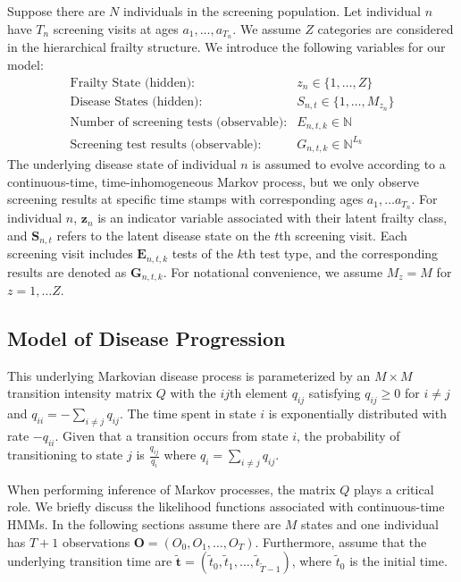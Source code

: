 \documentclass{article}
\begin{document}
Suppose there are $N$ individuals in the screening population.  Let individual $n$ have $T_n$ screening visits at ages $a_1, \ldots, a_{T_n}$. We assume $Z$ categories are considered in the hierarchical frailty structure. We introduce the following variables for our model:
\begin{eqnarray}
\textrm{Frailty State (hidden):} & z_{n} \in \{1, \ldots, Z\} \nonumber \\
\textrm{Disease States (hidden):} & S_{n, t} \in \{1, \ldots, M_{z_n}\} \nonumber \\
\textrm{Number of screening tests (observable):} & E_{n, t, k} \in \mathbb{N} \nonumber \\
\textrm{Screening test results (observable):} & G_{n,t,k} \in \mathbb{N}^{L_k} \nonumber 
\end{eqnarray}
The underlying disease state of individual $n$ is assumed to evolve according to a continuous-time, time-inhomogeneous Markov process, but we only observe screening results at specific time stamps with corresponding ages $a_1, \ldots a_{T_n}$. For individual $n$, $\bm z_n$ is an indicator variable  associated with their latent frailty class, and $\bm S_{n,t}$ refers to the latent disease state on the $t$th screening visit. Each screening visit includes $\bm E_{n,t,k}$ tests of the $k$th test type, and the corresponding results are denoted as $\bm G_{n,t,k}$. For notational convenience, we assume $M_z = M$ for $z = 1, \ldots Z$.


\subsection{Model of Disease Progression}

This underlying Markovian  disease process is parameterized by an $M \times M$ transition intensity matrix $Q$ with the $ij$th element $q_{ij}$ satisfying $q_{ij} \geq 0$ for $i\neq j$ and $q_{ii} = -\sum_{i\neq j}q_{ij}$.    
The time spent in state $i$ is exponentially distributed with rate $-q_{ii}$.  Given that a transition occurs from state $i$,  the probability of transitioning to state $j$ is $\frac{q_{ij}}{q_i}$ where $q_i = \sum_{i\neq j}q_{ij}$.

When performing inference of Markov processes, the matrix $Q$ plays a critical role. We briefly discuss the likelihood functions associated with continuous-time HMMs. In the following sections assume there are $M$ states and one individual has $T+1$ observations $\bm O = (O_0, O_1, \ldots, O_T)$. Furthermore, assume that the underlying transition time are $\tilde{\bm t} = (\tilde{t}_0, \tilde{t}_1, \ldots, \tilde{t}_{\tilde{T}-1})$, where $\tilde{t}_0$ is the initial time.
\end{document}
